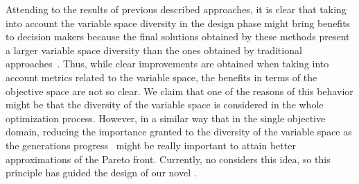 Attending to the results of previous described approaches, it is clear that taking into account the variable space
diversity in the design phase might bring benefits to decision makers because the final solutions obtained by these 
methods present a larger variable space diversity than the ones obtained by traditional 
approaches~\cite{deb2005omni, rudolph2007capabilities}.
%
Thus, while clear improvements are obtained when taking into account metrics related to the variable space, the benefits in terms of the 
objective space are not so clear.
%
We claim that one of the reasons of this behavior might be that the diversity of the variable space is considered 
in the whole optimization process.
%
However, in a similar way that in the single objective domain, reducing the importance granted to the diversity 
of the variable space as the generations progress~\cite{Joel:MULTI_DYNAMIC} might be really important to attain
better approximations of the Pareto front.
%
Currently, no \MOEA{} considers this idea, so this principle has guided the design of our novel \MOEA{}.
